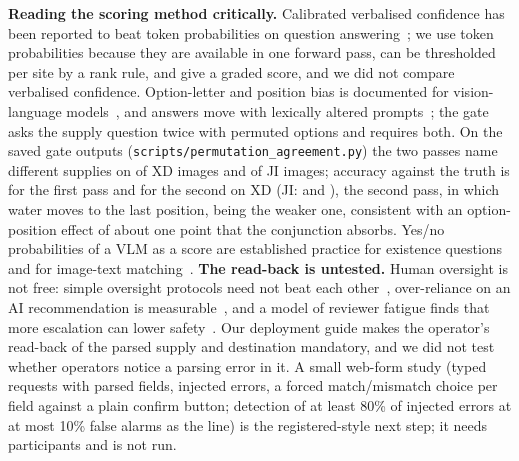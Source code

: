 \textbf{Reading the scoring method critically.} Calibrated verbalised confidence has been reported to beat token probabilities on question answering~\cite{tian2023justask}; we use token probabilities because they are available in one forward pass, can be thresholded per site by a rank rule, and give a graded score, and we did not compare verbalised confidence. Option-letter and position bias is documented for vision-language models~\cite{atabuzzaman2025mcqabias}, and answers move with lexically altered prompts~\cite{dumpala2024promptsensitivity}; the gate asks the supply question twice with permuted options and requires both. On the saved gate outputs (\texttt{scripts/permutation\_agreement.py}) the two passes name different supplies on \PAXDDisagree{} of \PAXDN{} XD images and \PAJIDisagree{} of \PAJIN{} JI images; accuracy against the truth is \PAXDOne{} for the first pass and \PAXDTwo{} for the second on XD (JI: \PAJIOne{} and \PAJITwo{}), the second pass, in which water moves to the last position, being the weaker one, consistent with an option-position effect of about one point that the conjunction absorbs. Yes/no probabilities of a VLM as a score are established practice for existence questions~\cite{li2023pope} and for image-text matching~\cite{lin2024vqascore}.
\textbf{The read-back is untested.} Human oversight is not free: simple oversight protocols need not beat each other~\cite{recchia2025confirmation}, over-reliance on an AI recommendation is measurable~\cite{horowitz2023automationbias}, and a model of reviewer fatigue finds that more escalation can lower safety~\cite{turan2026oversight}. Our deployment guide makes the operator's read-back of the parsed supply and destination mandatory, and we did not test whether operators notice a parsing error in it. A small web-form study (typed requests with parsed fields, injected errors, a forced match/mismatch choice per field against a plain confirm button; detection of at least 80\% of injected errors at at most 10\% false alarms as the line) is the registered-style next step; it needs participants and is not run.
